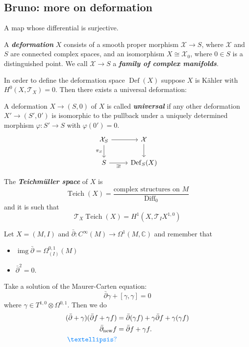 \documentclass{article}
\numberwithin{equation}{section}
\newcommand{\C}{\mathbb{C}}
\newcommand{\Tc}{\mathcal{T}}
\newcommand{\Xc}{\mathcal{X}}
\DeclareMathOperator{\img}{img}
\DeclareMathOperator{\Def}{Def}
\DeclareMathOperator{\Teich}{Teich}
\DeclareMathOperator{\Diff}{Diff}
\renewcommand{\Def}{\operatorname{Def}}
\begin{document}
\subsection{Bruno: more on deformation}
\begin{defn} A map whose differential is surjective.
\end{defn}
\begin{defn}
	A \textbf{\textit{deformation}} $X$ consists of a smooth proper morphism $\Xc \to S$, where $\Xc$ and $S$ are connected complex spaces, and an isomorphism $X \cong \Xc_0$, where $0\in S$ is a distinguished point. We call $\Xc\to S$ a \textbf{\textit{family of complex manifolds}}.
\end{defn}

In order to define the deformation space $\Def(X)$ suppose $X$ is Kähler with $H^0(X,\Tc_X)=0$. Then there exists a universal deformation:
\begin{defn}
	A deformation $X\to(S,0)$ of $X$ is called \textbf{\textit{universal}} if any other deformation $X' \to (S',0')$ is isomorphic to the pullback under a uniquely determined morphism $\varphi:S'\to S$ with $\varphi(0')=0$.
	\[\begin{tikzcd}
		\Xc_S\arrow[d,"\pi_S",swap]\arrow[r]&\Xc\arrow[d]\\
		S\arrow[r,"\exists!",swap]&\Def_S(X)
	\end{tikzcd}\]
\end{defn}
\begin{defn}
	The \textbf{\textit{Teichmüller space}} of $X$ is
	\[\Teich(X)=\frac{\text{complex structures on }M}{\Diff_0}\]
	and it is such that
	\[\Tc_X\Teich(X)=H^1(X,\Tc_IX^{1,0})\]
\end{defn}
\begin{remark}
	Let $X=(M,I)$ and $\bar\partial:C^\infty(M)\to\Omega^1(M,\C)$ and remember that
	\begin{itemize}
		\item $\img\bar\partial=\Omega^{0,1}_{(I)}(M)$
		\item $\bar\partial^2=0$.
	\end{itemize}
	Take a solution of the Maurer-Carten equation:
	\[\bar\partial\gamma+[\gamma,\gamma]=0\]
	where $\gamma\in T^{1,0}\otimes\Omega^{0,1}$. Then we do
	\begin{align*}
		(\bar\partial+\gamma)(\bar\partial f+\gamma f)&=\bar\partial(\gamma f)+\gamma\bar\partial f+\gamma(\gamma f)\\
		\bar\partial_{\text{new}}f&=\bar\partial f+\gamma f.\\
		{\color{azure}…?}
	\end{align*}
\end{remark}
\end{document}
